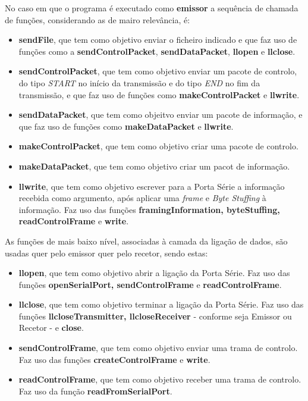 \documentclass[a4paper, 11pt]{article}
\begin{document}
No caso em que o programa é executado como \textbf{emissor} a sequência de chamada de funções, considerando as de mairo relevância, é:
\begin{itemize}
	\item \textbf{sendFile}, que tem como objetivo enviar o ficheiro indicado e que faz uso de funções como a \textbf{sendControlPacket}, \textbf{sendDataPacket}, \textbf{llopen} e \textbf{llclose}.
	\item \textbf{sendControlPacket}, que tem como objetivo enviar um pacote de controlo, do tipo \textit{START} no início da transmissão e do tipo \textit{END} no fim da transmissão, e que faz uso de funções como \textbf{makeControlPacket} e \textbf{llwrite}.
	\item \textbf{sendDataPacket},  que tem como objeitvo enviar um pacote de informação, e que faz uso de funções como \textbf{makeDataPacket} e \textbf{llwrite}.
	\item \textbf{makeControlPacket}, que tem como objetivo criar uma pacote de controlo.
	\item \textbf{makeDataPacket}, que tem como objetivo criar um pacot de informação.
	\item \textbf{llwrite}, que tem como objetivo escrever para a Porta Série a informação recebida como argumento, após aplicar uma \textit{frame} e \textit{Byte Stuffing} à informação. Faz uso das funções \textbf{framingInformation, byteStuffing, readControlFrame} e \textbf{write}.
\end{itemize}

As funções de mais baixo nível, associadas à camada da ligação de dados, são usadas quer pelo emissor quer pelo recetor, sendo estas:
\begin{itemize}
	\item \textbf{llopen}, que tem como objetivo abrir a ligação da Porta Série. Faz uso das funções \textbf{openSerialPort, sendControlFrame} e \textbf{readControlFrame}.
	\item \textbf{llclose}, que tem como objetivo terminar a ligação da Porta Série. Faz uso das funções \textbf{llcloseTransmitter, llcloseReceiver} - conforme seja Emissor ou Recetor - e \textbf{close}.
	\item \textbf{sendControlFrame}, que tem como objetivo enviar uma trama de controlo. Faz uso das funções \textbf{createControlFrame} e \textbf{write}.
	\item \textbf{readControlFrame}, que tem como objetivo receber uma trama de controlo. Faz uso da função \textbf{readFromSerialPort}.
\end{itemize}
\newpage
\end{document}
